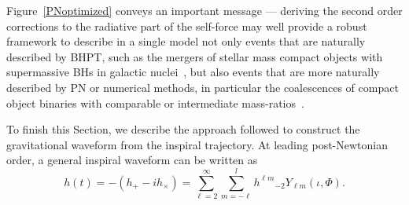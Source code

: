 Figure~\ref{PNoptimized} conveys an important message --- deriving the second order corrections to the radiative part of the self-force may well provide a robust framework to describe in a single model not only events that are naturally described by BHPT, such as the mergers of stellar mass compact objects with supermassive BHs in galactic nuclei~\cite{Huerta:2012, Huerta:2010, wargar, cutler, gairles, SFB, GairL:2013}, but also events that are more naturally described by PN or numerical methods, in particular the coalescences of compact object binaries with comparable or intermediate mass-ratios~\cite{Huerta:2012, higherspin, Huerta:2011a, Huerta:2011b, smallbody}.

To finish this Section, we describe the approach followed to construct the gravitational waveform from the inspiral trajectory. At leading post-Newtonian order, a general inspiral waveform can be written as
\begin{equation}
h(t) = -(h_{+} - i h_{\times}) = \sum_{\ell=2}^{\infty} \sum_{m=-\ell}^{l} h^{\ell m} {}_{-\!2}Y_{\ell m}(\iota,\Phi).
\label{inspwav}
\end{equation}


